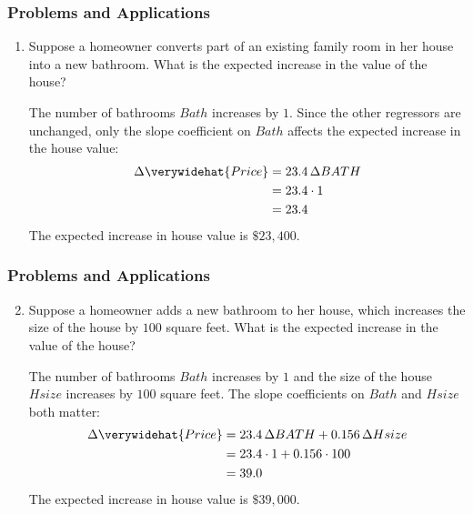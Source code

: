 \begin{frame}
\frametitle{Problems and Applications}

\begin{enumerate}\setcounter{enumi}{0}

\item Suppose a homeowner converts part of an existing family room in her house into a new bathroom. What is the expected increase in the value of the house?

\begin{answer}
The number of bathrooms $Bath$ increases by $1$. Since the other regressors are unchanged, only the slope coefficient on $Bath$ affects the expected increase in the house value:
\begin{align*}
\Delta\verywidehat{Price} 
  & = 23.4\,\Delta BATH\\
  & = 23.4 \cdot 1\\
  & = 23.4
\end{align*}
The expected increase in house value is $\$23,400$.
\end{answer}

\end{enumerate}
\end{frame}


\begin{frame}
\frametitle{Problems and Applications}

\begin{enumerate}\setcounter{enumi}{1}

\item Suppose a homeowner adds a new bathroom to her house, which increases the size of the house by $100$ square feet. What is the expected increase in the value of the house?

\begin{answer}
The number of bathrooms $Bath$ increases by $1$ and the size of the house $Hsize$ increases by $100$ square feet. The slope coefficients on $Bath$ and $Hsize$ both matter:
\begin{align*}
\Delta\verywidehat{Price} 
  & = 23.4\,\Delta BATH + 0.156\,\Delta Hsize\\
  & = 23.4 \cdot 1 + 0.156 \cdot 100\\
  & = 39.0
\end{align*}
The expected increase in house value is $\$39,000$.
\end{answer}

\end{enumerate}
\end{frame}


